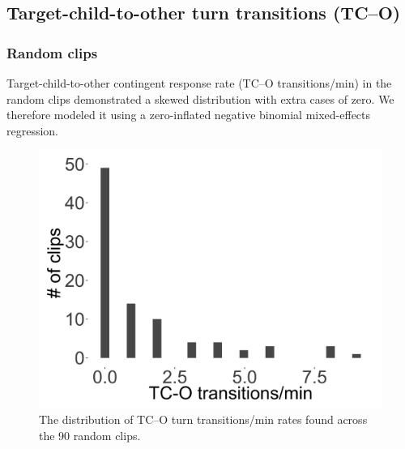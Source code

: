 \documentclass[floatsintext,man]{apa6}
\theoremstyle{definition}
\theoremstyle{definition}
\theoremstyle{definition}
\theoremstyle{remark}
\begin{document}
\FloatBarrier

\subsection{Target-child-to-other turn transitions
(TC--O)}\label{models-tc_o}

\subsubsection{Random clips}\label{models-tc_o-random}

Target-child-to-other contingent response rate (TC--O transitions/min)
in the random clips demonstrated a skewed distribution with extra cases
of zero. We therefore modeled it using a zero-inflated negative binomial
mixed-effects regression.

\FloatBarrier

\begin{figure}[H]

{\centering \includegraphics[width=0.4\linewidth]{www/c_o_tpm_random_distribution} 

}

\caption{The distribution of TC--O turn transitions/min rates found across the 90 random clips.}\label{fig:fig13}
\end{figure}

\FloatBarrier
\end{document}
